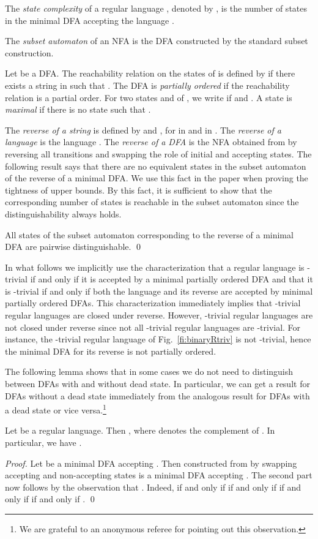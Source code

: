 \documentclass[runningheads]{llncs}
\newcommand{\R}{}
\newcommand{\J}{}
\begin{document}
  The \emph{state complexity} of a regular language , denoted by , is the number of states in the minimal DFA accepting the language .

  The {\em subset automaton\/} of an NFA  is the DFA   constructed by the standard subset construction.
  
  Let  be a DFA. The reachability relation  on the states of  is defined by  if there exists a string  in  such that . The DFA  is {\em partially ordered\/} if the reachability relation  is a partial order. For two states  and  of , we write  if  and . A state  is {\em maximal\/} if there is no state  such that . 

  The \emph{reverse  of a string \/} is defined by  and , for  in  and  in . The \emph{reverse of a language\/}  is the language . The \emph{reverse of a DFA\/}  is the NFA  obtained from  by reversing all transitions and swapping the role of initial and accepting states. 
  The following result says that there are no equivalent states in the subset automaton of the reverse of a minimal DFA. We use this fact in the paper when proving the tightness of upper bounds. By this fact, it is sufficient to show that the corresponding number of states is reachable in the subset automaton since the distinguishability always holds.
  \begin{fact}[\cite{br63}]\label{le:equiv}
    All states of the subset automaton corresponding to  the reverse of a minimal DFA are pairwise distinguishable.
    \qed
  \end{fact}

  In what follows we implicitly use the characterization that a regular language is \R-trivial if and only if it is accepted by a minimal partially ordered DFA and that it is \J-trivial if and only if both the language and its reverse are accepted by minimal partially ordered DFAs. This characterization immediately implies that \J-trivial regular languages are closed under reverse. However, \R-trivial regular languages are not closed under reverse since not all \R-trivial regular languages are \J-trivial. For instance, the \R-trivial regular language of Fig.~\ref{fi:binaryRtriv} is not \J-trivial, hence the minimal DFA for its reverse is not partially ordered.

  The following lemma shows that in some cases we do not need to distinguish between DFAs with and without dead state. In particular, we can get a result for DFAs without a dead state immediately from the analogous result for DFAs with a dead state or vice versa.\footnote{We are grateful to an anonymous referee for pointing out this observation.} 
  \begin{lemma}\label{lem:complement}
    Let  be a regular language. Then , where  denotes the complement of . 
    In particular, we have .
  \end{lemma}
\begin{proof}
    Let  be a minimal DFA accepting . Then  constructed from  by swapping accepting and non-accepting states is a minimal DFA accepting . The second part now follows by the observation that . 
    Indeed,  if and only if  if and only if  if and only if  if and only if .
    \qed
  \end{proof}
\end{document}
